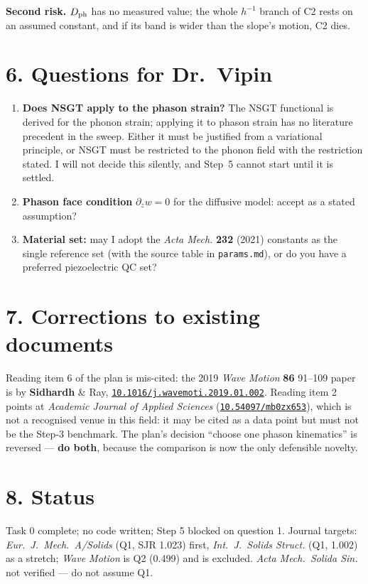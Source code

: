 \documentclass[11pt]{article}
\newcommand{\doi}[1]{\href{https://doi.org/#1}{\texttt{#1}}}
\begin{document}
\textbf{Second risk.} $D_{\rm ph}$ has no measured value; the whole $h^{-1}$ branch of C2 rests on an
assumed constant, and if its band is wider than the slope's motion, C2 dies.

\section*{6. Questions for Dr.\ Vipin}
\begin{enumerate}\small
\item \textbf{Does NSGT apply to the phason strain?} The NSGT functional is derived for the phonon
  strain; applying it to phason strain has no literature precedent in the sweep. Either it must be
  justified from a variational principle, or NSGT must be restricted to the phonon field with the
  restriction stated. I will not decide this silently, and Step~5 cannot start until it is settled.
\item \textbf{Phason face condition} $\partial_z w=0$ for the diffusive model: accept as a stated
  assumption?
\item \textbf{Material set:} may I adopt the \emph{Acta Mech.} \textbf{232} (2021) constants as the
  single reference set (with the source table in \texttt{params.md}), or do you have a preferred
  piezoelectric QC set?
\end{enumerate}

\section*{7. Corrections to existing documents}
Reading item 6 of the plan is mis-cited: the 2019 \emph{Wave Motion} \textbf{86} 91--109 paper is by
\textbf{Sidhardh} \& Ray, \doi{10.1016/j.wavemoti.2019.01.002}. Reading item 2 points at
\emph{Academic Journal of Applied Sciences} (\doi{10.54097/mb0zx653}), which is not a recognised
venue in this field: it may be cited as a data point but must not be the Step-3 benchmark. The plan's
decision ``choose one phason kinematics'' is reversed --- \textbf{do both}, because the comparison is
now the only defensible novelty.

\section*{8. Status}
Task 0 complete; no code written; Step 5 blocked on question 1. Journal targets: \emph{Eur.\ J.\
Mech.\ A/Solids} (Q1, SJR 1.023) first, \emph{Int.\ J.\ Solids Struct.} (Q1, 1.002) as a stretch;
\emph{Wave Motion} is Q2 (0.499) and is excluded. \emph{Acta Mech.\ Solida Sin.} not verified --- do
not assume Q1.
\end{document}

